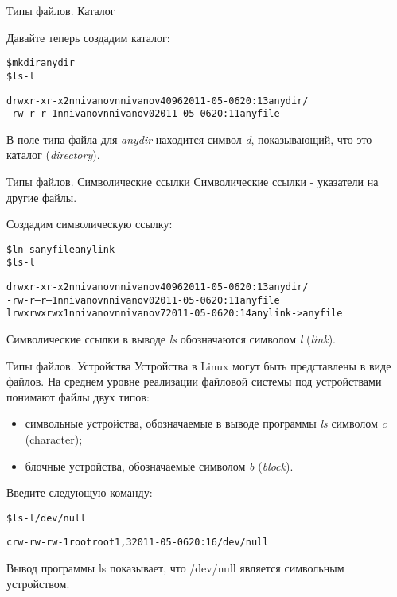 \documentclass{beamer}
\begin{document}
\begin{frame}[fragile]{Типы файлов. Каталог}
\begin{block}{Давайте теперь создадим каталог:}
\begin{alltt}
\$ mkdir anydir
\$ ls -l

drwxr-xr-x 2 nnivanov nnivanov 4096 2011-05-06 20:13 anydir/
-rw-r--r-- 1 nnivanov nnivanov 0 2011-05-06 20:11 anyfile
\end{alltt}
\end{block}
В поле типа файла для \textit{anydir} находится символ \textit{d}, показывающий, что это каталог
(\textit{directory}).
\end{frame}

\begin{frame}[fragile]{Типы файлов. Символические ссылки}
Символические ссылки - указатели на другие файлы.
\begin{block}{Создадим символическую ссылку:}
\begin{alltt}
\$ ln -s anyfile anylink
\$ ls -l

drwxr-xr-x 2 nnivanov nnivanov 4096 2011-05-06 20:13 anydir/
-rw-r--r-- 1 nnivanov nnivanov 0 2011-05-06 20:11 anyfile
lrwxrwxrwx 1 nnivanov nnivanov 7 2011-05-06 20:14 anylink -> anyfile
\end{alltt}
\end{block}
Символические ссылки в выводе \textit{ls} обозначаются символом \textit{l} (\textit{link}).
\end{frame}

\begin{frame}[fragile]{Типы файлов. Устройства}
Устройства в Linux могут быть представлены в виде файлов. На среднем уровне
реализации файловой системы под устройствами понимают файлы двух типов:
\begin{itemize}
\item символьные устройства, обозначаемые в выводе программы \textit{ls} символом \textit{c} (character);
\item блочные устройства, обозначаемые символом \textit{b} (\textit{block}).
\end{itemize}
\begin{block}{Введите следующую команду:}
\begin{alltt}
\$ ls -l /dev/null

crw-rw-rw- 1 root root 1, 3 2011-05-06 20:16 /dev/null
\end{alltt}
\end{block}
Вывод программы ls показывает, что /dev/null является символьным устройством.
\end{frame}
\end{document}
